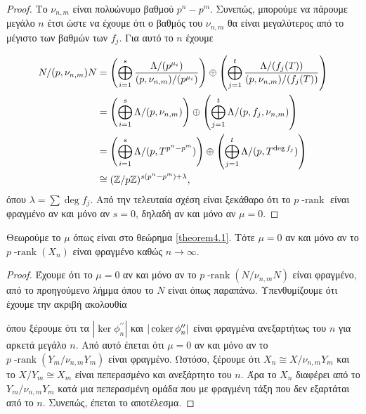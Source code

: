 \begin{proof} Το $\nu_{n,m}$ είναι  πολυώνυμο βαθμού $p^n-p^m$. Συνεπώς, μπορούμε να πάρουμε μεγάλο $n$ έτσι ώστε να έχουμε ότι ο βαθμός του $\nu_{n,m}$ θα είναι μεγαλύτερος από το μέγιστο των βαθμών των $f_j$. Για αυτό το $n$ έχουμε

    \begin{align*} 
        N/(p,\nu_{n,m})N &= \left( \bigoplus\limits_{i=1}^s \frac{\Lambda/(p^{\mu_i})}{ (p,\nu_{n,m})/(p^{\mu_i})}\right) \oplus \left( \bigoplus\limits_{j=1}^t \frac{\Lambda/(f_j(T))}{ (p,\nu_{n,m})/(f_j(T))}\right)\\
        &= \left( \bigoplus\limits_{i=1}^s \Lambda/(p,\nu_{n,m})\right) \oplus \left( \bigoplus\limits_{j=1}^t \Lambda/(p,f_j,\nu_{n,m})\right) \\
        &= \left( \bigoplus\limits_{i=1}^s \Lambda/(p,T^{p^n - p^m})\right) \oplus \left( \bigoplus\limits_{j=1}^t \Lambda/(p,T^{\deg f_j})\right) \\
        &\cong (\mathbb{Z}/p\mathbb{Z})^{s(p^n-p^m)+\lambda},
    \end{align*} όπου $\lambda = \sum \deg f_j$. Από την τελευταία σχέση είναι ξεκάθαρο ότι το $p\operatorname{-rank}$ είναι φραγμένο αν και μόνο αν $s=0$, δηλαδή αν και μόνο αν $\mu = 0$.
\end{proof}

\begin{prop}
    Θεωρούμε το $\mu$ όπως είναι στο θεώρημα \ref{theorem4.1}. Τότε $\mu = 0$ αν και μόνο αν το $p\operatorname{-rank}(X_n)$ είναι φραγμένο καθώς $n\longrightarrow \infty$.
\end{prop}

\begin{proof}Έχουμε ότι το $\mu = 0$ αν και μόνο αν το $p\operatorname{-rank}(N/\nu_{n,m}N)$ είναι φραγμένο, από το προηγούμενο λήμμα όπου το $N$ είναι όπως παραπάνω. Υπενθυμίζουμε ότι έχουμε την ακριβή ακολουθία

    \begin{figure}[H]
        \centering
    \end{figure} 
    \noindent όπου ξέρουμε ότι τα $|\ker\phi^{\prime\prime}_n|$ και $|\operatorname{coker}\phi^{\prime\prime}_n|$ είναι φραγμένα ανεξαρτήτως του $n$ για αρκετά μεγάλο $n$. Από αυτό έπεται ότι $\mu = 0$ αν και μόνο αν το $p\operatorname{-rank}(Y_m/\nu_{n,m}Y_m)$ είναι φραγμένο. Ωστόσο, ξέρουμε ότι $X_n\cong X/\nu_{n,m}Y_m$ και το $X/Y_m \cong X_m$ είναι πεπερασμένο και ανεξάρτητο του $n$. Άρα το $X_n$ διαφέρει από το $Y_m/\nu_{n,m}Y_m$ κατά μια πεπερασμένη ομάδα που με φραγμένη τάξη που δεν εξαρτάται από το $n$. Συνεπώς, έπεται το αποτέλεσμα.
\end{proof}